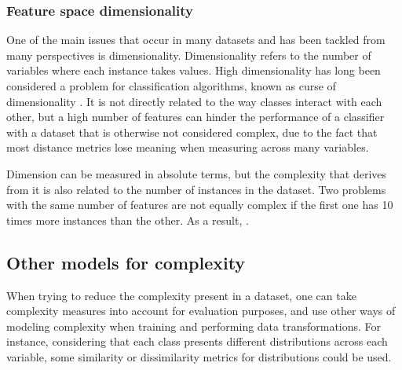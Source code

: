 \subsubsection{Feature space dimensionality}

One of the main issues that occur in many datasets and has been tackled from many perspectives is dimensionality. Dimensionality refers to the number of variables where each instance takes values. High dimensionality has long been considered a problem for classification algorithms, known as curse of dimensionality . It is not directly related to the way classes interact with each other, but a high number of features can hinder the performance of a classifier with a dataset that is otherwise not considered complex, due to the fact that most distance metrics lose meaning when measuring across many variables.

Dimension can be measured in absolute terms, but the complexity that derives from it is also related to the number of instances in the dataset. Two problems with the same number of features are not equally complex if the first one has 10 times more instances than the other. As a result, .




\subsection{Other models for complexity}

When trying to reduce the complexity present in a dataset, one can take complexity measures into account for evaluation purposes, and use other ways of modeling complexity when training and performing data transformations. For instance, considering that each class presents different distributions across each variable, some similarity or dissimilarity metrics for distributions could be used.

